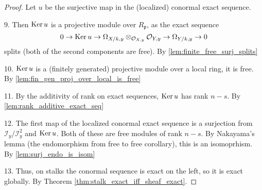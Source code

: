 \begin{corollary}
\begin{proof}
  Let $u$ be the surjective map in the (localized) conormal exact sequence.

  9.  Then $\operatorname{Ker} u$ is a projective module over $R_\mathfrak{p}$, as
      the exact sequence
      \[
        0 \to \operatorname{Ker} u \to 
        \Omega_{X/k,y} \otimes_{\mathcal{O}_{X,y}} \mathcal{O}_{Y,y} 
        \to
        \Omega_{Y/k,y} 
        \to 0
      \]
      splits (both of the second components are free).
      By \ref{lem:finite_free_surj_splits}

  10. $\operatorname{Ker} u$ is a (finitely generated) projective module over a local ring, it is free.
      By \ref{lem:fin_gen_proj_over_local_is_free}
      
  11. By the additivity of rank on exact sequences, $\operatorname{Ker} u$ has rank $n-s$.
      By \ref{lem:rank_additive_exact_seq}

  12. The first map of the localized conormal exact sequence is a surjection from
      $\mathcal{I}_y / \mathcal{I}^2_y$ and $\operatorname{Ker} u$. 
      Both of these are free modules of rank $n-s$. 
      By Nakayama's lemma (the endomorphism from free to free corollary),
      this is an isomoprhism.
      By \ref{lem:surj_endo_is_isom}

  13. Thus, on stalks the conormal sequence is exact on the left, so it is 
      exact globally.
      By Theorem \ref{thm:stalk_exact_iff_sheaf_exact}.
\end{proof}


\end{corollary}
